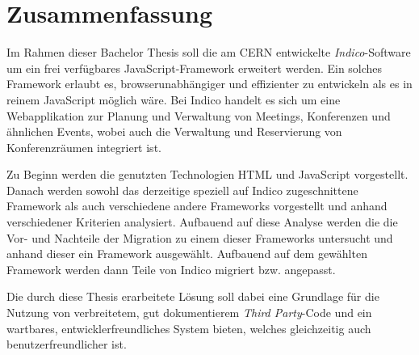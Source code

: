 \chapter*{Zusammenfassung}
\thispagestyle{empty}

Im Rahmen dieser Bachelor Thesis soll die am CERN entwickelte \emph{Indico}-Software um ein
frei verfügbares JavaScript-Framework erweitert werden. Ein solches Framework erlaubt es,
browserunabhängiger und effizienter zu entwickeln als es in reinem JavaScript möglich wäre. Bei
Indico handelt es sich um eine Webapplikation zur Planung und Verwaltung von Meetings, Konferenzen
und ähnlichen Events, wobei auch die Verwaltung und Reservierung von Konferenzräumen integriert ist.

Zu Beginn werden die genutzten Technologien HTML und JavaScript vorgestellt. Danach werden sowohl
das derzeitige speziell auf Indico zugeschnittene Framework als auch verschiedene andere Frameworks
vorgestellt und anhand verschiedener Kriterien analysiert. Aufbauend auf diese Analyse werden die
die Vor- und Nachteile der Migration zu einem dieser Frameworks untersucht und anhand dieser ein
Framework ausgewählt. Aufbauend auf dem gewählten Framework werden dann Teile von Indico migriert
bzw. angepasst.

Die durch diese Thesis erarbeitete Lösung soll dabei eine Grundlage für die Nutzung von
verbreitetem, gut dokumentierem \emph{Third Party}-Code und ein wartbares, entwicklerfreundliches
System bieten, welches gleichzeitig auch benutzerfreundlicher ist.
